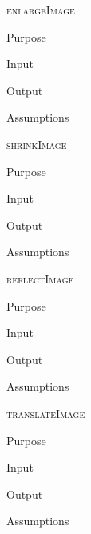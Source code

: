 \documentclass[pdftex, 11pt]{article}
\begin{document}
\begin{description}
\begin{description}
		\end{description}


	\item{\textsc{enlargeImage}}
		\begin{description}
			\item{Purpose}


			\item{Input}


			\item{Output}


			\item{Assumptions}


		\end{description}


	\item{\textsc{shrinkImage}}
		\begin{description}
			\item{Purpose}


			\item{Input}


			\item{Output}


			\item{Assumptions}


		\end{description}


	\item{\textsc{reflectImage}}
		\begin{description}
			\item{Purpose}


			\item{Input}


			\item{Output}


			\item{Assumptions}


		\end{description}


	\item{\textsc{translateImage}}
		\begin{description}
			\item{Purpose}


			\item{Input}


			\item{Output}


			\item{Assumptions}


		\end{description}



\end{description}
\end{document}
